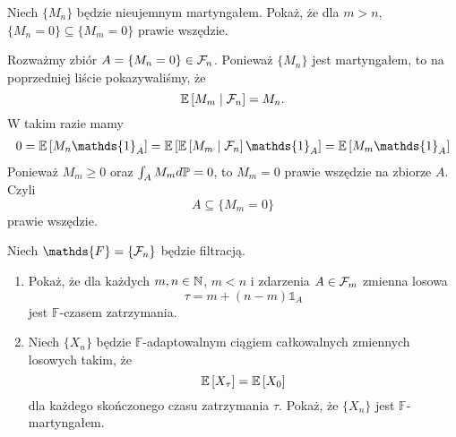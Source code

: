 \begin{problem}
  Niech $\{M_n\}$ będzie nieujemnym martyngałem. Pokaż, że dla $m>n$, $\{M_n=0\}\subseteq\{M_m=0\}$ prawie wszędzie.
\end{problem}

\begin{solution}
  Rozważmy zbiór $A=\{M_n=0\}\in\mathcal{F}_n$. Ponieważ $\{M_n\}$ jest martyngałem, to na poprzedniej liście pokazywaliśmy, że
  $$\expected{M_m}{\set{F}_n}=M_n.$$
  W takim razie mamy
  \begin{align*}
    0=\expected{M_n\mathds{1}_A}=\expected{\expected{M_m}{\set{F}_n}\mathds{1}_A}=\expected{M_m\mathds{1}_A}
  \end{align*}
  Ponieważ $M_m\geq0$ oraz $\int_AM_md\prob=0$, to $M_m=0$ prawie wszędzie na zbiorze $A$. Czyli 
  $$A\subseteq\{M_m=0\}$$ 
  prawie wszędzie.

%
%
%
\end{solution}

\begin{problem}
  Niech $\mathds{F}=\{\set{F}_n\}$ będzie filtracją.
  \begin{enumerate}[label=(\alph*)]
    \item Pokaż, że dla każdych $m,n\in\operatorname{\mathbb{N}}$, $m<n$ i zdarzenia $A\in\mathcal{F}_m$ zmienna losowa
      $$\tau=m+(n-m)\mathds{1}_A$$
      jest $\mathds{F}$-czasem zatrzymania.
    \item Niech $\{X_n\}$ będzie $\mathds{F}$-adaptowalnym ciągiem całkowalnych zmiennych losowych takim, że
      $$\expected{X_\tau}=\expected{X_0}$$
      dla każdego skończonego czasu zatrzymania $\tau$. Pokaż, że $\{X_n\}$ jest $\mathds{F}$-martyngałem.
  \end{enumerate}
\end{problem}

